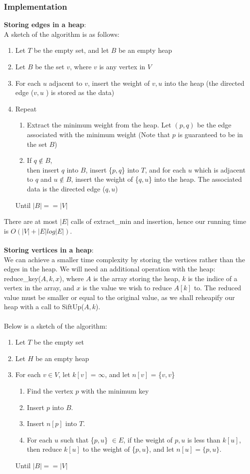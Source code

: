 \documentclass[a4paper]{article}
\begin{document}
\subsubsection{Implementation}
\textbf{Storing edges in a heap}:\\
A sketch of the algorithm is as follows:
\begin{enumerate} \itemsep0em
	\item Let $T$ be the empty set, and let $B$ be an empty heap
	\item Let $B$ be the set {$v$}, where $v$ is any vertex in $V$
	\item For each $u$ adjacent to $v$, insert the weight of ${v,u}$ into the heap (the directed edge ($v,u$ ) is stored as the data)
	\item Repeat
	\begin{enumerate}
		\item Extract the minimum weight from the heap. Let $(p,q)$ be the edge associated with the minimum weight (Note that $p$ is guaranteed to be in the set $B$)
		\item If $q\notin B$, \\then insert $q$ into $B$, insert \{$p,q$\} into $T$, and for each $u$ which is adjacent to $q$ and $u\notin B$, insert the weight of \{$q,u$\} into the heap. The associated data is the directed edge ($q,u$)
	\end{enumerate}
	Until $|B| == |V|$
\end{enumerate}
There are at most $|E|$ calls of extract\_min and insertion, hence our running time is $O(|V| + |E|log|E|)$.\\\\
\textbf{Storing vertices in a heap}:\\
We can achieve a smaller time complexity by storing the vertices rather than the edges in the heap. We will need an additional operation with the heap: reduce\_key($A, k, x$), where $A$ is the array storing the heap, $k$ is the indice of a vertex in the array, and $x$ is the value we wish to reduce $A[k]$ to. The reduced value must be smaller or equal to the original value, as we shall reheapify our heap with a call to SiftUp($A, k$).\\\\
Below is a sketch of the algorithm:
\begin{enumerate} \itemsep0em
	\item Let $T$ be the empty set
	\item Let $H$ be an empty heap
	\item For each $v\in V$, let $k[v]$ = $\infty$, and let $n[v]$ = \{$v,v$\}
	\begin{enumerate}
		\item Find the vertex $p$ with the minimum key
		\item Insert $p$ into $B$.
		\item Insert $n[p]$ into $T$.
		\item For each $u$ such that \{$p,u$\} $\in E$,
		if the weight of {$p,u$ is less than $k[u]$}, then reduce $k[u]$ to the weight of \{$p,u$\}, and let $n[u] = \{p,u\}$.
	\end{enumerate}
	Until $|B| == |V|$
\end{enumerate}
\end{document}
